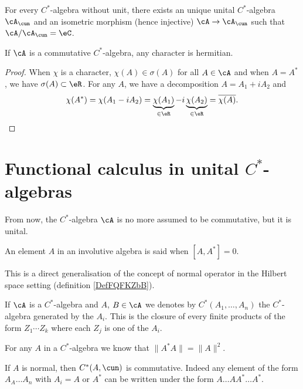 \begin{proposition}
For every $C^*$-algebra without unit, there exists an unique unital $C^*$-algebra $\cA_{\cun}$ and an isometric morphism (hence injective) $\cA\to\cA_{\cun}$ such that $\cA/\cA_{\cun}=\eC$.
\label{prop_unitariz_csa}
\end{proposition}

\begin{proposition}
If $\cA$ is a commutative $C^*$-algebra, any character is hermitian.
\end{proposition}

\begin{proof}
When $\chi$ is a character, $\chi(A)\in\sigma(A)$ for all $A\in\cA$ and when $A=A^*$, we have $\sigma(A)\subset\eR$. For any $A$, we have a decomposition $A=A_1+iA_2$ and
\[ 
  \chi(A^*)=\chi(A_1-iA_2)=\underbrace{\chi(A_1)}_{\in\eR}-i\underbrace{\chi(A_2)}_{\in\eR}=\overline{ \chi(A) }.
\]
\end{proof}

\section{Functional calculus in unital \texorpdfstring{$C^*$}{C}-algebras}

From now, the $C^*$-algebra $\cA$ is no more assumed to be commutative, but it is unital. 

\begin{definition}      \label{DefElemNormal}
    An element $A$ in an involutive algebra is said  when $[A,A^*]=0$.
\end{definition}
This is a direct generalisation of the concept of normal operator in the Hilbert space setting (definition \ref{DefFQFKZbB}).

If $\cA$ is a $C^{*}$-algebra and $A$, $B\in\cA$ we denotes by $C^*(A_1,\ldots,A_n)$ the $C^{*}$-algebra generated by the $A_i$. This is the closure of every finite products of the form $Z_1\cdots Z_k$ where each $Z_j$ is one of the $A_i$.

For any $A$ in a $C^{*}$-algebra we know that $\|A^*A\|=\|A\|^2$.

If $A$ is normal, then $C^*(A,\cun)$ is commutative. Indeed any element of the form $A_A\ldots A_n$ with $A_i=A$ or $A^*$ can be written under the form $A\ldots AA^*\ldots A^*$.

